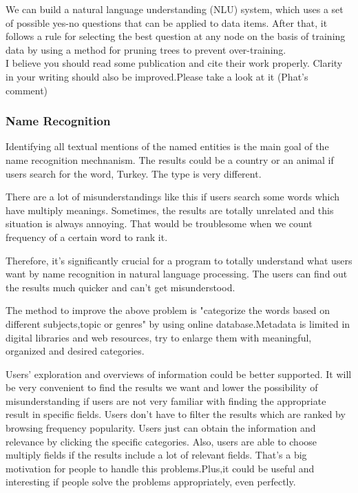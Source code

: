 We can build a natural language understanding (NLU) system, which uses a set of possible yes-no questions that can be applied to data items. After that, it follows a rule for selecting the best question at any node on the basis of training data by using a method for pruning trees to prevent over-training.\\ 

I believe you should read some publication and cite their work properly. Clarity in your writing should also be improved.Please take a look at it (Phat's comment)

\subsubsection*{Name Recognition}
Identifying all textual mentions of the named entities is the main goal of the name recognition mechnanism. 
The results could be a country or an animal if users search for the word, Turkey. The type is very different.

There are a lot of misunderstandings like this if users search some words which have multiply meanings. Sometimes, the results are totally unrelated and this situation is always annoying. That would be troublesome when we count frequency of a certain word to rank it.
 
Therefore, it's significantly crucial for a program to totally understand what users want by name recognition in natural language processing. The users can find out the results much quicker and can't get misunderstood.

The method to improve the above problem is "categorize the words based on different subjects,topic or genres" by using online database.Metadata is limited in digital libraries and web resources, try to enlarge them with meaningful, organized and desired categories.\cite{10.1145/1141753.1141801}

Users' exploration and overviews of information could be better supported. It will be very convenient to find the results we want and lower the possibility of misunderstanding if users are not very familiar with finding the appropriate result in specific fields.\cite{DBLP:journals/jis/NaT09} Users don't have to filter the results which are ranked by browsing frequency  popularity. Users just can obtain the information and relevance by clicking the specific categories. Also, users are able to choose multiply fields if the results include a lot of relevant fields. That's a big motivation for people to handle this problems.Plus,it could be useful and interesting if people solve the problems appropriately, even perfectly.  

